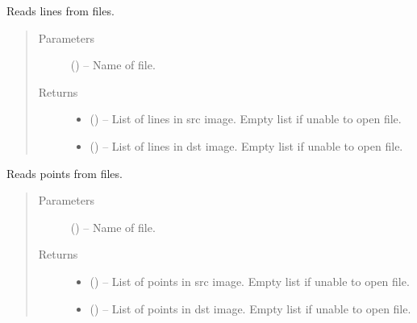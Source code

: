 \documentclass[letterpaper,10pt,english]{sphinxmanual}
\begin{document}
\begin{fulllineitems}
\label{\detokenize{image_io:image_io.read_lines}}
Reads lines from files.
\begin{quote}\begin{description}
\item[{Parameters}] \leavevmode
{} () -- Name of file.

\item[{Returns}] \leavevmode
\begin{itemize}
\item {} 
 () -- List of lines in src image. Empty list if unable to open file.

\item {} 
 () -- List of lines in dst image. Empty list if unable to open file.

\end{itemize}


\end{description}\end{quote}

\end{fulllineitems}


\begin{fulllineitems}
\label{\detokenize{image_io:image_io.read_points}}
Reads points from files.
\begin{quote}\begin{description}
\item[{Parameters}] \leavevmode
{} () -- Name of file.

\item[{Returns}] \leavevmode
\begin{itemize}
\item {} 
 () -- List of points in src image. Empty list if unable to open file.

\item {} 
 () -- List of points in dst image. Empty list if unable to open file.

\end{itemize}


\end{description}\end{quote}

\end{fulllineitems}
\end{document}
